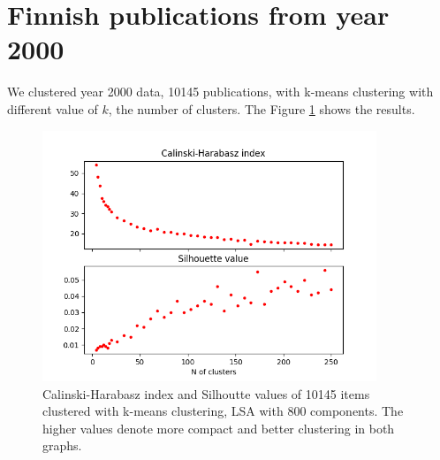 \section{Finnish publications from year 2000}
We clustered year 2000 data, 10145 publications, with k-means 
clustering with different value of $k$, the number of clusters. 
The Figure \ref{fig:ch-silh02} shows the results.
\begin{figure}[ht]
  \begin{center}    
\includegraphics[width=10cm]{images/c-h-silh-index-plot-y2000-2_260-800-kmeans.png}
    \caption{Calinski-Harabasz index and Silhoutte values of 
10145 items clustered with k-means clustering, LSA with 800 
components. The higher values denote more compact and better 
clustering in both graphs.}
    \label{fig:ch-silh02}
  \end{center}
\end{figure}

